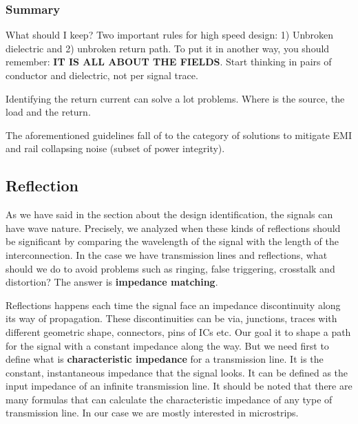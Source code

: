 \documentclass[final]{cubedoc}
\begin{document}
	
	\subsubsection{Summary}
	
	What should I keep? Two important rules for high speed design: 1) Unbroken dielectric and 2) unbroken return path.
	To put it in another way, you should remember: \textbf{IT IS ALL ABOUT THE FIELDS}. Start thinking in pairs of conductor and dielectric, not per signal trace.
	
	Identifying the return current can solve a lot problems. Where is the source, the load and the return.
	
	
	The aforementioned guidelines fall of to the category of solutions to mitigate EMI and rail collapsing noise (subset of power integrity).
	
	\subsection{Reflection}
	
	As we have said in the section about the design identification, the signals can have wave nature. Precisely, we analyzed when these kinds of reflections should be significant by comparing the wavelength of the signal with the length of the interconnection. In the case we have transmission lines and reflections, what should we do to avoid problems such as ringing, false triggering, crosstalk and distortion? The answer is \textbf{impedance matching}.
	
	Reflections happens each time the signal face an impedance discontinuity along its way of propagation. These discontinuities can be via, junctions, traces with different geometric shape, connectors, pins of ICs etc. Our goal it to shape a path for the signal with a constant impedance along the way. But we need first to define what is \textbf{characteristic impedance} for a transmission line. It is the constant, instantaneous impedance that the signal looks. It can be defined as the input impedance of an infinite transmission line. It should be noted that there are many formulas that can calculate the characteristic impedance of any type of transmission line. In our case we are mostly interested in microstrips.
	
\end{document}
